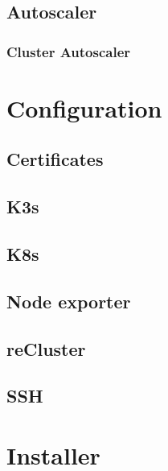 \subsection{Autoscaler}
\label{subsec:implementation_dependencies_autoscaler}

\subsubsection{Cluster Autoscaler}
\label{subsec:implementation_dependencies_autoscaler_cluster_autoscaler}

\section{Configuration}
\label{sec:implementation_configuration}

\subsection{Certificates}
\label{subsec:implementation_configuration_certificates}

\subsection{K3s}
\label{subsec:implementation_configuration_k3s}

\subsection{K8s}
\label{subsec:implementation_configuration_k8s}

\subsection{Node exporter}
\label{subsec:implementation_configuration_node_exporter}

\subsection{reCluster}
\label{subsec:implementation_configuration_recluster}

\subsection{SSH}
\label{subsec:implementation_configuration_ssh}

\section{Installer}
\label{sec:implementation_installer}

